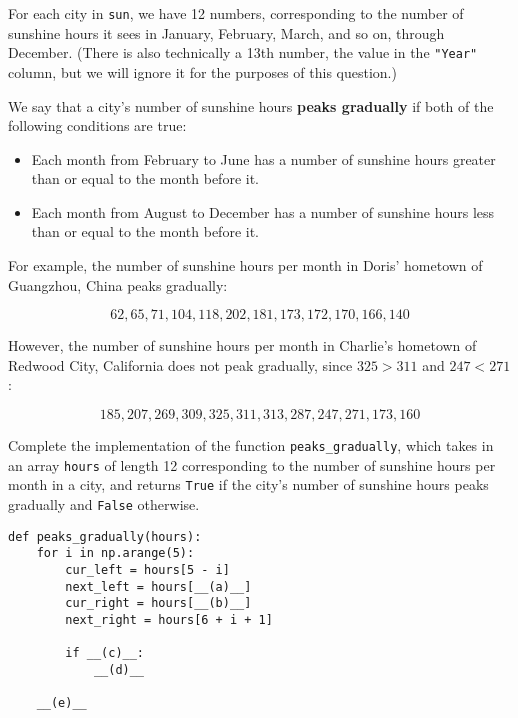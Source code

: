 \newpage

\begin{prob}[(8 pts)]

For each city in \texttt{sun}, we have 12 numbers, corresponding to the number of sunshine hours it sees in January, February, March, and so on, through December. (There is also technically a 13th number, the value in the \texttt{"Year"} column, but we will ignore it for the purposes of this question.)

We say that a city's number of sunshine hours \textbf{peaks gradually} if both of the following conditions are true:
\begin{itemize}
    \item Each month from February to June has a number of sunshine hours greater than or equal to the month before it.
    \item Each month from August to December has a number of sunshine hours less than or equal to the month before it.
\end{itemize}

For example, the number of sunshine hours per month in Doris' hometown of Guangzhou, China peaks gradually:

$$62, 65, 71, 104, 118, 202, 181, 173, 172, 170, 166, 140$$

However, the number of sunshine hours per month in Charlie's hometown of Redwood City, California does not peak gradually, since $325 > 311$ and $247 < 271$:

$$185, 207, 269, 309, 325, 311, 313, 287, 247, 271, 173, 160$$

Complete the implementation of the function \texttt{peaks\_gradually}, which takes in an array \texttt{hours} of length 12 corresponding to the number of sunshine hours per month in a city, and returns \texttt{True} if the city's number of sunshine hours peaks gradually and \texttt{False} otherwise.

\begin{verbatim}
def peaks_gradually(hours):
    for i in np.arange(5):
        cur_left = hours[5 - i]
        next_left = hours[__(a)__]
        cur_right = hours[__(b)__]
        next_right = hours[6 + i + 1]

        if __(c)__:
            __(d)__
        
    __(e)__
\end{verbatim}

\newpage

\begin{subprobset}


\end{subprobset}
\end{prob}
